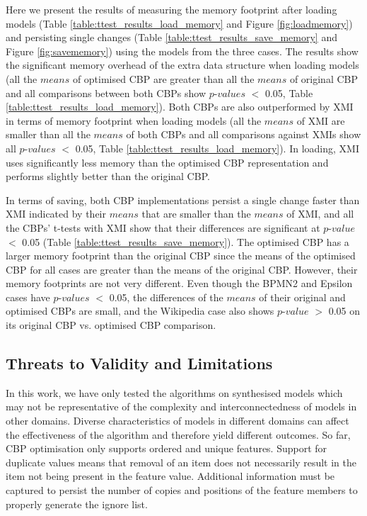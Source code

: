 \documentclass{llncs}
\begin{document}
    Here we present the results of measuring the memory footprint after loading models (Table \ref{table:ttest_results_load_memory} and Figure \ref{fig:loadmemory}) and persisting single changes (Table \ref{table:ttest_results_save_memory} and Figure \ref{fig:savememory}) using the models from the three cases. The results show the significant memory overhead of the extra data structure when loading models (all the $means$ of optimised CBP are greater than all the $means$ of original CBP and all comparisons between both CBPs show $p$-$values$ $<$ 0.05, Table \ref{table:ttest_results_load_memory}). Both CBPs are also outperformed by XMI in terms of memory footprint when loading models (all the $means$ of XMI are smaller than all the $means$ of both CBPs and all comparisons against XMIs show all $p$-$values$ $<$ 0.05, Table \ref{table:ttest_results_load_memory}). In loading, XMI uses significantly less memory than the optimised CBP representation and performs slightly better than the original CBP.   
    
    In terms of saving, both CBP implementations persist a single change faster than XMI indicated by their $means$ that are smaller than the $means$ of XMI, and all the CBPs' t-tests with XMI show that their differences are significant at $p$-$value$ $<$ 0.05 (Table \ref{table:ttest_results_save_memory}). The optimised CBP has a larger memory footprint than the original CBP since the means of the optimised CBP for all cases are greater than the means of the original CBP. However, their memory footprints are not very different. Even though the BPMN2 and Epsilon cases have $p$-$values$ $<$ 0.05, the differences of the $means$ of their original and optimised CBPs are small, and the Wikipedia case also shows $p$-$value$ $>$ 0.05 on its original CBP vs. optimised CBP comparison.   
   
    \vspace{-15pt}
    \subsection{Threats to Validity and Limitations}
    \label{sec:limitations_and_future_work}
    
    \vspace{-10pt}
    In this work, we have only tested the algorithms on synthesised  models which may not be representative of the complexity and interconnectedness of models in other domains. Diverse characteristics of models in different domains can affect the effectiveness of the algorithm and therefore yield different outcomes. So far, CBP optimisation only supports ordered and unique features. Support for duplicate values means that removal of an item does not necessarily result in the item not being present in the feature value. Additional information must be captured to persist the number of copies and positions of the feature members to properly generate the ignore list. 
    
\end{document}
